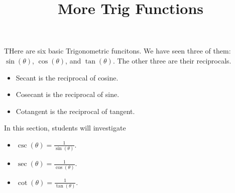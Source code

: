 \documentclass{ximera}
\title{More Trig Functions}
\begin{document}
\begin{abstract}
%
\end{abstract}
\maketitle



THere are six basic Trigonometric funcitons.  We have seen three of them: $\sin(\theta)$, $\cos(\theta)$, and $\tan(\theta)$. The other three are their reciprocals.


\begin{itemize}
\item Secant is the reciprocal of cosine.
\item Cosecant is the reciprocal of sine.
\item Cotangent is the reciprocal of tangent.
\end{itemize}







\begin{sectionOutcomes}
In this section, students will investigate

\begin{itemize}
\item $\csc(\theta) = \frac{1}{\sin(\theta)}$.
\item $\sec(\theta) = \frac{1}{\cos(\theta)}$.
\item $\cot(\theta) = \frac{1}{\tan(\theta)}$.
\end{itemize}
\end{sectionOutcomes}
\end{document}
